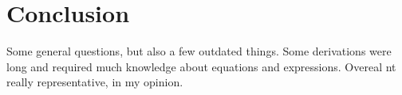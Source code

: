\section{Conclusion}

Some general questions, but also a few outdated things. Some derivations were long and required much knowledge about equations and expressions. Overeal nt really representative, in my opinion.